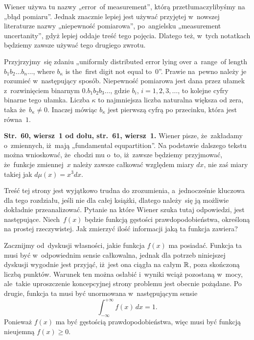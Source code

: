 \documentclass[a4paper,11pt]{article}
\numberwithin{equation}{section}
\begin{document}
\VerSpaceFour





\noindent
{} Wiener używa tu nazwy „error~of measurement”, którą
przetłumaczylibyśmy na „błąd pomiaru”. Jednak znacznie lepiej jest
używać przyjętej w~nowszej literaturze nazwy „niepewność pomiarowa”,
po~angielsku „measurement uncertanity”, gdyż lepiej oddaje treść tego
pojęcia. Dlatego też, w~tych notatkach będziemy zawsze używać tego drugiego
zwrotu.

\VerSpaceFour





\noindent
{} Przyjrzyjmy~się zdaniu „uniformly distributed
error lying over a~range~of length $b_{ 1 } b_{ 2 } \ldots b_{ n }\ldots$, where
$b_{ \kappa }$ is the~first digit not equal to~$0$”. Prawie na~pewno należy je
rozumieć w~następujący sposób. Niepewność pomiarowa jest dana przez ułamek
z~rozwinięciem binarnym $0.b_{ 1 } b_{ 2 } b_{ 3 }\ldots$, gdzie $b_{ i }$,
$i = 1, 2, 3, \ldots$, to kolejne cyfry binarne tego ułamka. Liczba $\kappa$ to
najmniejsza liczba naturalna większa od zera, taka że~$b_{ \kappa } \neq 0$.
Inaczej mówiąc $b_{ \kappa }$ jest pierwszą cyfrą po przecinku, która jest
równa~$1$.

\VerSpaceFour





\noindent
\textbf{Str.~60, wiersz~1 od dołu, str.~61, wiersz~1.} Wiener pisze,
że~zakładamy o~zmiennych, iż~mają „fundamental equpartition”. Na podstawie
dalszego tekstu można wnioskować, że~chodzi mu o~to, iż~zawsze będziemy
przyjmować, że~funkcje zmiennej~$x$ należy zawsze całkować względem miary
$dx$, nie zaś miary takiej jak $d\mu( x ) = x^{ 3 } dx$.

\VerSpaceFour





\noindent
{} Treść tej strony jest wyjątkowo trudna do zrozumienia,
a~jednocześnie kluczowa dla tego rozdziału, jeśli nie dla całej książki,
dlatego należy~się ją możliwie dokładnie przeanalizować. Pytanie na które
Wiener szuka tutaj odpowiedzi, jest następujące. Niech~$f( x )$ będzie
funkcją gęstości prawdopodobieństwa, określoną na prostej rzeczywistej. Jak
zmierzyć ilość informacji jaką ta funkcja zawiera?

Zacznijmy od~dyskusji własności, jakie funkcja $f( x )$ ma posiadać. Funkcja
ta musi być w~odpowiednim sensie całkowalna, jednak dla potrzeb niniejszej
dyskusji wygodnie jest przyjąć, iż~jest ona ciągła na całym $\mathbb{R}$, poza
skończoną liczbą punktów. Warunek ten można osłabić i~wyniki wciąż pozostaną
w~mocy, ale~takie uproszczenie koncepcyjnej strony problemu jest obecnie
pożądane. Po drugie, funkcja ta musi być unormowana w~następującym sensie
\begin{equation}
  \label{eq:Winere-Cybernetics-ETC-01}
  \int_{ -\infty }^{ +\infty } f( x ) \, dx = 1.
\end{equation}
Ponieważ $f( x )$ ma być gęstością prawdopodobieństwa, więc musi być funkcją
nieujemną $f( x ) \geq 0$.
\end{document}
